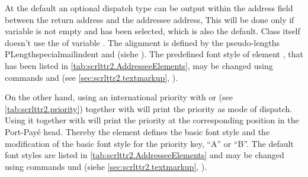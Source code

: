%
At the default  an optional dispatch
type can be output within the
address field between the return address and the addressee address, This will
be done only if variable  is not empty and
 has been
selected, which is also the default. Class  itself doesn't use
the  of variable . The alignment is
defined by the pseudo-lengths PLength{specialmailindent} and
 (siehe
). The predefined
font style of element
, that has been
listed in \autoref{tab:scrlttr2.AddresseeElements}, may be changed using
commands  and  (see
\autoref{sec:scrlttr2.textmarkup},
).%
%

%
%
On the other hand, using an international priority
with  or
 (see \autoref{tab:scrlttr2.priority}) together with
 will print the priority as mode of
dispatch. Using it together with
 will print
the priority at the corresponding position in the Port-Pay\'e head. Thereby
the element  defines the basic font style and
 the modification of the basic font style for the
priority key, ``A'' or ``B''. The default font styles are listed in
\autoref{tab:scrlttr2.AddresseeElements} and may be changed using commands  und  (siehe
\autoref{sec:scrlttr2.textmarkup},
).%
%
%
%

